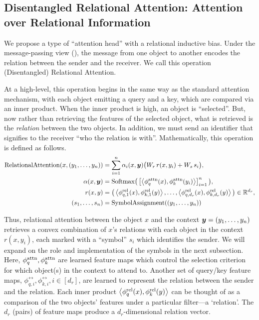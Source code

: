 \subsection{Disentangled Relational Attention: Attention over Relational Information}

We propose a type of ``attention head'' with a relational inductive bias. Under the message-passing view (), the message from one object to another encodes the relation between the sender and the receiver. We call this operation (Disentangled) Relational Attention.

At a high-level, this operation begins in the same way as the standard attention mechanism, with each object emitting a query and a key, which are compared via an inner product. When the inner product is high, an object is ``selected''. But, now rather than retrieving the features of the selected object, what is retrieved is the \textit{relation} between the two objects. In addition, we must send an identifier that signifies to the receiver ``who the relation is with''. Mathematically, this operation is defined as follows.
\begin{equation}\label{eq:rel_attn}
  \begin{split}
    \mathrm{RelationalAttention}(x, (y_1, \ldots, y_n)) &= \sum_{i=1}^{n} \alpha_i(x, \bm{y}) \big(W_r \, r(x, y_i) + W_s \, s_i\big), \\
    \alpha(x, \bm{y}) &= \mathrm{Softmax}\big(\left[\left \langle \phi_q^{\mathrm{attn}}(x), \phi_k^{\mathrm{attn}}(y_i) \right\rangle\right]_{i=1}^{n}\big), \\
    r(x, y) &= \big(\left \langle \phi_{q,1}^{\mathrm{rel}}(x), \phi_{k,1}^{\mathrm{rel}}(y) \right\rangle, \ldots, \left \langle \phi_{q, d_r}^{\mathrm{rel}}(x), \phi_{k, d_r}^{\mathrm{rel}}(y) \right\rangle\big) \in \mathbb{R}^{d_r}, \\
    (s_1, \ldots, s_n) &= \mathrm{SymbolAssignment}((y_1, \ldots, y_n))
  \end{split}
\end{equation}

Thus, relational attention between the object $x$ and the context $\bm{y} = (y_1, \ldots, y_n)$ retrieves a convex combination of $x$'s relations with each object in the context $r(x, y_i)$, each marked with a ``symbol'' $s_i$ which identifies the sender. We will expand on the role and implementation of the symbols in the next subsection. Here, $\phi_q^{\mathrm{attn}}, \phi_k^{\mathrm{attn}}$ are learned feature maps which control the selection criterion for which object(s) in the context to attend to. Another set of query/key feature maps, $\phi_{q,i}^{\rel}, \phi_{k,i}^{\rel}, i \in [d_r]$, are learned to represent the relation between the sender and the relation. Each inner product $\left \langle \phi_q^{\mathrm{rel}}(x), \phi_k^{\mathrm{rel}}(y) \right\rangle$ can be thought of as a comparison of the two objects' features under a particular filter---a `relation'. The $d_r$ (pairs) of feature maps produce a $d_r$-dimensional relation vector.

